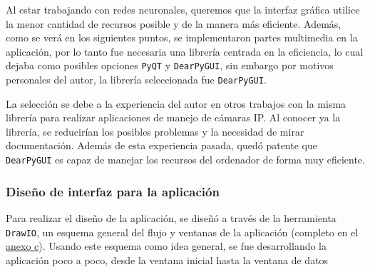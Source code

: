 \vspace{2\baselineskip}

Al estar trabajando con redes neuronales, queremos que la interfaz gráfica utilice la menor cantidad de recursos posible y de la manera más eficiente. Además, como se verá en los siguientes puntos, 
se implementaron partes multimedia en la aplicación, por lo tanto fue necesaria una librería centrada en la eficiencia, lo cual dejaba como posibles opciones 
\texttt{PyQT} y \texttt{DearPyGUI}, sin embargo por motivos personales del autor, la librería seleccionada fue \texttt{DearPyGUI}.

La selección se debe a la experiencia del autor en otros trabajos con la misma librería para realizar aplicaciones de manejo de cámaras IP. Al conocer ya la librería, se reducirían 
los posibles problemas y la necesidad de mirar documentación. Además de esta experiencia pasada, quedó patente que \texttt{DearPyGUI} es capaz de manejar los recursos del ordenador de forma muy eficiente.

\clearpage
\subsubsection{Diseño de interfaz para la aplicación}

Para realizar el diseño de la aplicación, se diseñó a través de la herramienta \texttt{DrawIO}, un esquema general del flujo y ventanas de la aplicación (completo en el \hyperref[esquema:FlujoVentanas]{anexo c}).\newline
Usando este esquema como idea general, se fue desarrollando la aplicación poco a poco, desde la ventana inicial hasta la ventana de datos

